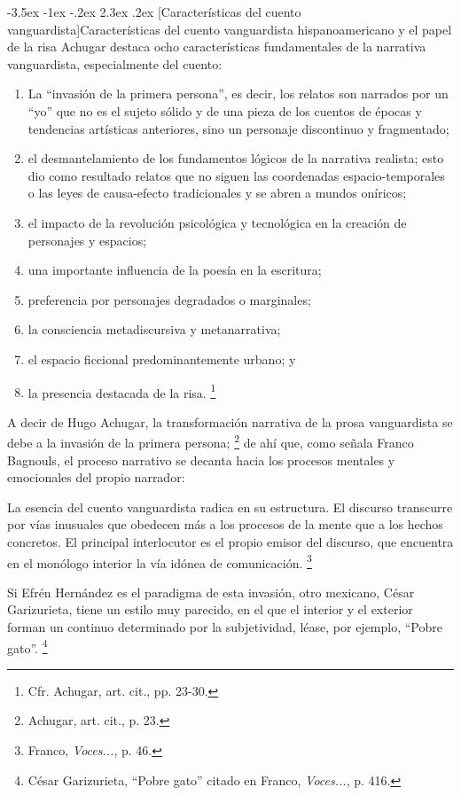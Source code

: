 \documentclass[14pt,twoside,final]{extbook} %
\makeatletter
\let\oldfootnote\footnote
\renewcommand\footnote[1]{%
\oldfootnote{\hspace{1mm}#1}}
\renewcommand\section{\@startsection {section}{1}{\z@}%
                                     {-3.5ex \@plus -1ex \@minus -.2ex}%
                                     {2.3ex \@plus .2ex}%
                                     {\normalfont\large\bfseries\sc}}
\makeatother
\begin{document}
\section[Características del cuento vanguardista]{Características del cuento vanguardista hispanoamericano y el papel de la risa}\label{sec:caracteristicas-del-cuento-vanguardista-hispanoamericano-y-el-papel-de-la-risa}\protect\enlargethispage*{\baselineskip}
Achugar destaca ocho características fundamentales de la narrativa vanguardista, especialmente del cuento:
\begin{enumerate}[noitemsep]
\item La ``invasión de la primera persona'', es decir, los relatos son narrados por un ``yo'' que no es el sujeto sólido y de una pieza de los cuentos de épocas y tendencias artísticas anteriores, sino un personaje discontinuo y fragmentado;
\item el desmantelamiento de los fundamentos lógicos de la narrativa realista; esto dio como resultado relatos que no siguen las coordenadas espacio-temporales o las leyes de causa-efecto tradicionales y se abren a mundos oníricos;
\item el impacto de la revolución psicológica y tecnológica en la creación de personajes y espacios;
\item una importante influencia de la poesía en la escritura;
\item preferencia por personajes degradados o marginales;
\item la consciencia metadiscursiva y metanarrativa;
\item el espacio ficcional predominantemente urbano; y
\item la presencia destacada de la risa.\footnote{Cfr. Achugar, art. cit., pp. 23-30.}
\end{enumerate}
A decir de Hugo Achugar, la transformación narrativa de la prosa vanguardista se debe a la invasión de la primera persona;\footnote{Achugar, art. cit., p. 23.} de ahí que, como señala Franco Bagnouls, el proceso narrativo se decanta hacia los procesos mentales y emocionales del propio narrador: 
\begin{quoting}
La esencia del cuento vanguardista radica en su estructura. El discurso transcurre por vías inusuales que obedecen más a los procesos de la mente que a los hechos concretos. El principal interlocutor es el propio emisor del discurso, que encuentra en el monólogo interior la vía idónea de comunicación.\footnote{Franco, \emph{Voces...}, p. 46.}
\end{quoting}
Si Efrén Hernández es el paradigma de esta invasión, otro mexicano, César Garizurieta, tiene un estilo muy parecido, en el que el interior y el exterior forman un continuo determinado por la subjetividad, léase, por ejemplo, ``Pobre gato''.\footnote{César Garizurieta, ``Pobre gato'' citado en Franco, \emph{Voces...}, p. 416.}
\end{document}
